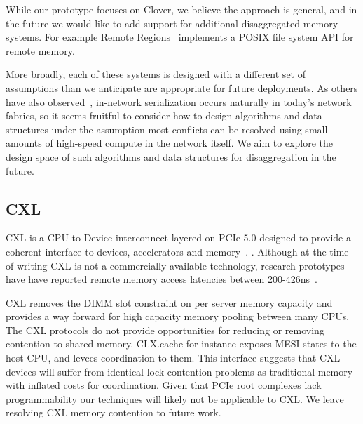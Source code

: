 %
While our prototype focuses on Clover, we believe the
approach is general, and in the future we would like to add support
for additional disaggregated memory systems. For example Remote
Regions~\cite{reigons} implements a POSIX file system API for remote
memory.

More broadly, each of these systems is designed with a different set
of assumptions than we anticipate are appropriate for future
deployments.  As others have also observed~\cite{mom}, in-network
serialization occurs naturally in today's network fabrics, so it seems
fruitful to consider how to design algorithms and data structures
under the assumption most conflicts can be resolved using small
amounts of high-speed compute in the network itself. We aim to explore
the design space of such algorithms and data structures for
disaggregation in the future.

\subsection{CXL} 

CXL is a CPU-to-Device interconnect layered on PCIe 5.0 designed to provide a
coherent interface to devices, accelerators and memory~\cite{cxl-spec}.  .
Although at the time of writing CXL is not a commercially available technology,
research prototypes have have reported remote memory access latencies between
200-426ns~\cite{direct-cxl,microsoft-cxl-first-gen,facebook-cxl-tpp}.

CXL removes the DIMM slot constraint on per server memory capacity and
provides a way forward for high capacity memory pooling between many CPUs. The CXL protocols do
not provide opportunities for reducing or removing contention to shared memory.
CLX.cache for instance exposes MESI states to the host CPU, and levees
coordination to them. This interface suggests that CXL devices will suffer from
identical lock contention problems as traditional memory with inflated costs for
coordination. Given that PCIe root complexes lack programmability our techniques
will likely not be applicable to CXL. We leave resolving CXL memory contention
to future work.